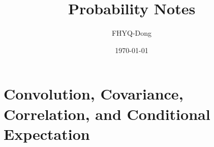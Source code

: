 \documentclass[device=normal, lang=en]{elegantbook}
\title{Probability Notes}
\author{FHYQ-Dong}
\date{\today}
\numberwithin{equation}{section}
\begin{document}
\maketitle
\frontmatter

\tableofcontents
\mainmatter












\chapter{Convolution, Covariance, Correlation, and Conditional Expectation}
\end{document}
